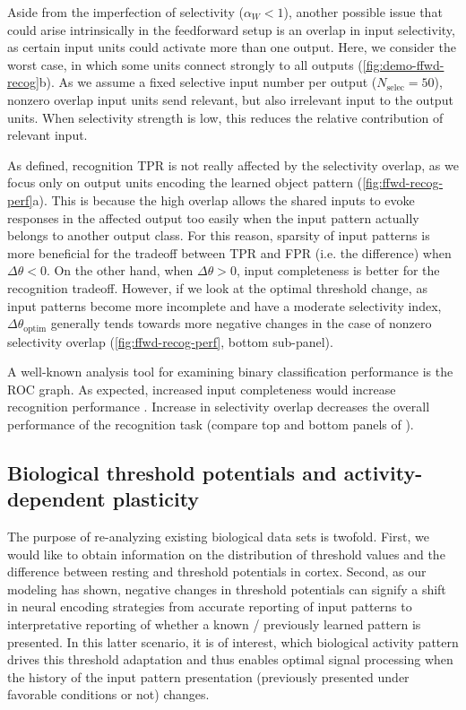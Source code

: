 Aside from the imperfection of selectivity ($\alpha_W < 1$),
        another possible issue that could arise intrinsically in the feedforward setup is
        an overlap in input selectivity, as certain input units could activate more than one output.
    Here, we consider the worst case, in which some units connect strongly to all outputs (\autoref{fig:demo-ffwd-recog}b).
    As we assume a fixed selective input number per output ($N_{\text{selec}} = 50$),
        nonzero overlap input units send relevant,
        but also irrelevant input to the output units.
    When selectivity strength is low, this reduces the relative contribution of relevant input.

As defined, recognition TPR is not really affected by the selectivity overlap,
        as we focus only on output units encoding the learned object pattern
        (\autoref{fig:ffwd-recog-perf}a).
    This is because the high overlap allows the shared inputs
        to evoke responses in the affected output too easily
        when the input pattern actually belongs to another output class.
    For this reason, sparsity of input patterns is more beneficial
        for the tradeoff between TPR and FPR (i.e. the difference) when $\Delta \theta < 0$.
    On the other hand, when $\Delta \theta > 0$, input completeness is better for the recognition tradeoff.
    However, if we look at the optimal threshold change,
        as input patterns become more incomplete and have a moderate selectivity index,
        $\Delta \theta_{\mathrm{optim}}$ generally tends towards more negative changes
        in the case of nonzero selectivity overlap
        (\autoref{fig:ffwd-recog-perf}, bottom sub-panel).

A well-known analysis tool for examining binary classification performance is the ROC graph.
    As expected,
        increased input completeness
        would increase recognition performance
        .
    Increase in selectivity overlap decreases the overall performance of the recognition task
        (compare top and bottom panels of
        ).

\subsection{Biological threshold potentials and activity-dependent plasticity}

The purpose of re-analyzing existing biological data sets is twofold.
    First, we would like to obtain information on the distribution of threshold values
        and the difference between resting and threshold potentials in cortex.
    Second, as our modeling has shown, negative changes in threshold potentials
        can signify a shift in neural encoding strategies
        from accurate reporting of input patterns
        to interpretative reporting of whether a known / previously learned pattern is presented.
    In this latter scenario, it is of interest,
        which biological activity pattern drives this threshold adaptation
        and thus enables optimal signal processing
        when the history of the input pattern presentation (previously presented under favorable conditions or not) changes.

